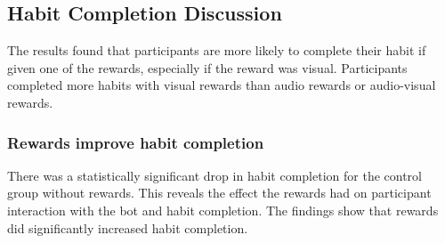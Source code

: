 \documentclass{scaffold/sigchi}
\begin{document}





\subsection{Habit Completion Discussion}
The results found that participants are more likely to complete their habit if given one of the rewards, especially if the reward was visual. Participants completed more habits with visual rewards than audio rewards or audio-visual rewards.

\subsubsection{Rewards improve habit completion}
There was a statistically significant drop in habit completion for the control group without rewards. This reveals the effect the rewards had on participant interaction with the bot and habit completion. The findings show that rewards did significantly increased habit completion.
\end{document}
